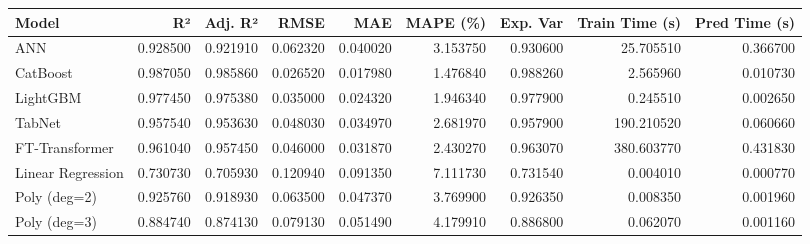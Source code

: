 \begin{tabular}{lrrrrrrrr}
\toprule
Model & R² & Adj. R² & RMSE & MAE & MAPE (\%) & Exp. Var & Train Time (s) & Pred Time (s) \\
\midrule
ANN & 0.928500 & 0.921910 & 0.062320 & 0.040020 & 3.153750 & 0.930600 & 25.705510 & 0.366700 \\
CatBoost & 0.987050 & 0.985860 & 0.026520 & 0.017980 & 1.476840 & 0.988260 & 2.565960 & 0.010730 \\
LightGBM & 0.977450 & 0.975380 & 0.035000 & 0.024320 & 1.946340 & 0.977900 & 0.245510 & 0.002650 \\
TabNet & 0.957540 & 0.953630 & 0.048030 & 0.034970 & 2.681970 & 0.957900 & 190.210520 & 0.060660 \\
FT-Transformer & 0.961040 & 0.957450 & 0.046000 & 0.031870 & 2.430270 & 0.963070 & 380.603770 & 0.431830 \\
Linear Regression & 0.730730 & 0.705930 & 0.120940 & 0.091350 & 7.111730 & 0.731540 & 0.004010 & 0.000770 \\
Poly (deg=2) & 0.925760 & 0.918930 & 0.063500 & 0.047370 & 3.769900 & 0.926350 & 0.008350 & 0.001960 \\
Poly (deg=3) & 0.884740 & 0.874130 & 0.079130 & 0.051490 & 4.179910 & 0.886800 & 0.062070 & 0.001160 \\
\bottomrule
\end{tabular}
